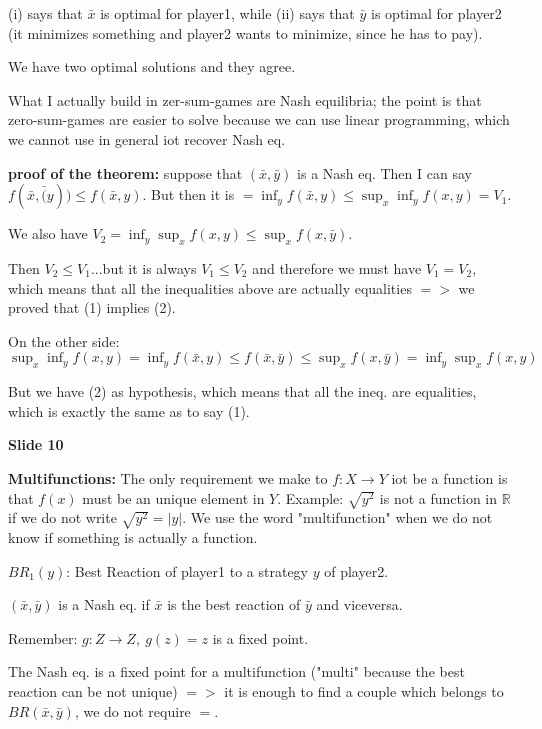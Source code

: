 \noindent (i) says that $\bar{x}$ is optimal for player1, while (ii) says 
that $\bar{y}$ is optimal for player2 (it minimizes something and 
player2 wants to minimize, since he has to pay).

\noindent We have two optimal solutions and they agree.

\noindent What I actually build in zer-sum-games are Nash equilibria; 
the point is that zero-sum-games are easier to solve because we can use 
linear programming, which we cannot use in general iot recover Nash eq.

\noindent \textbf{proof of the theorem:} suppose that $(\bar{x},\bar{y})$ 
is a Nash eq. Then I can say $f(\bar{x},\bar(y)) \leq f(\bar{x},y)$. But 
then it is $ = \inf_y{f(\bar{x},y) \leq \sup_x{\inf_y{f(x,y)}}} = V_1$.

\noindent We also have $V_2 = \inf_y{\sup_x{f(x,y)}} \leq 
\sup_x{f(x,\bar{y})}$.

\noindent Then $V_2 \leq V_1$...but it is always $V_1 \leq V_2$ and 
therefore we must have $V_1 = V_2$, which means that all the inequalities 
above are actually equalities $=>$ we proved that (1) implies (2).

\noindent On the other side: 
$\sup_x{\inf_y{f(x,y)}} = \inf_y{f(\bar{x},y)} \leq f(\bar{x},\bar{y}) 
\leq \sup_x{f(x,\bar{y})} = \inf_y{\sup_x{f(x,y)}}$

\noindent But we have (2) as hypothesis, which means that all the 
ineq. are equalities, which is exactly the same as to say (1).

\bigskip
\noindent \textbf{Slide 10}

\noindent \textbf{Multifunctions:} The only requirement we make to 
$f: X \rightarrow Y$ iot be a function is that $f(x)$ must be an unique 
element in $Y$. Example: $\sqrt{y^2}$ is not a function in $\mathbb{R}$ 
if we do not write $\sqrt{y^2}=|y|$. We use the word "multifunction" 
when we do not know if something is actually a function.

\noindent $BR_1(y)$: Best Reaction of player1 to a strategy $y$ of player2.

\noindent $(\bar{x},\bar{y})$ is a Nash eq. if $\bar{x}$ is the best 
reaction of $\bar{y}$ and viceversa.

\noindent Remember: $g: Z \rightarrow Z, ~g(z) = z$ is a fixed point.

\noindent The Nash eq. is a fixed point for a multifunction ("multi" 
because the best reaction can be not unique) $=>$ it is enough to 
find a couple which belongs to $BR(\bar{x},\bar{y})$, we do not require $=$.

